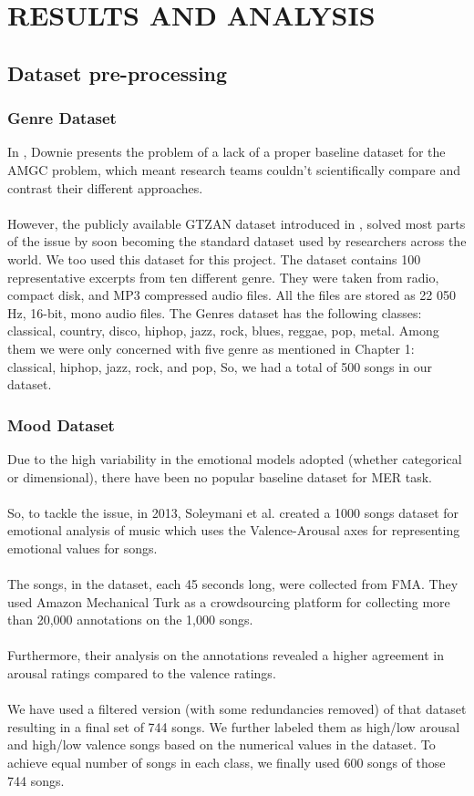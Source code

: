 \newpage
\section{RESULTS AND ANALYSIS}


\subsection{Dataset pre-processing}

\subsubsection{Genre Dataset}
In \cite{Downie2003}, Downie presents the problem of a lack of a proper baseline dataset for the AMGC problem, which meant research teams couldn’t scientifically compare and contrast their different approaches.\\
\\
However, the publicly available GTZAN dataset introduced in \cite{Tzanetakis2002}, solved most parts of the issue by soon becoming the standard dataset used by researchers across the world. We too used this dataset for this project. The dataset contains 100 representative excerpts from ten different genre. They were taken from radio, compact disk, and MP3 compressed audio files. All the files are stored as 22 050 Hz, 16-bit, mono audio files. The Genres dataset has the following classes: classical, country, disco, hiphop, jazz, rock, blues, reggae, pop, metal. Among them we were only concerned with five genre as mentioned in Chapter 1: classical, hiphop, jazz, rock, and pop, So, we had a total of 500 songs in our dataset.

\subsubsection{Mood Dataset}
Due to the high variability in the emotional models adopted (whether categorical or dimensional), there have been no popular baseline dataset for MER task.\\
\\
So, to tackle the issue, in 2013, Soleymani et al. \cite{Soleymani2013} created a 1000 songs dataset for emotional analysis of music which uses the Valence-Arousal axes for representing emotional values for songs.\\
\\
The songs, in the dataset, each 45 seconds long, were collected from FMA. They used Amazon Mechanical Turk as a crowdsourcing platform for collecting more than 20,000 annotations on the 1,000 songs.\\
\\
Furthermore, their analysis on the annotations revealed a higher agreement in arousal ratings compared to the valence ratings.\\
\\
We have used a filtered version (with some redundancies removed) of that dataset resulting in a final set of 744 songs. We further labeled them as high/low arousal and high/low valence songs based on the numerical values in the dataset. To achieve equal number of songs in each class, we finally used 600 songs of those 744 songs. 

